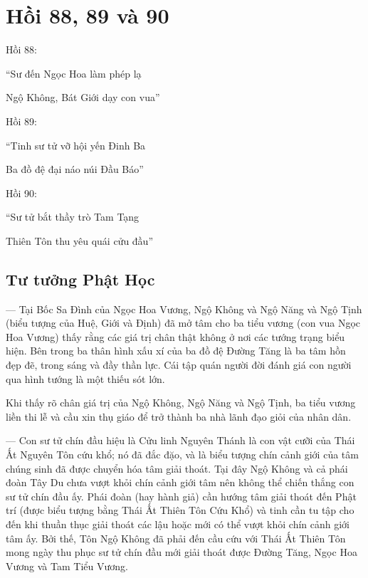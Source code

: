\chapter{Hồi 88, 89 và 90} %
\label{cha:hoi_88_89_90}

Hồi 88:

\begin{itshape}
``Sư đến Ngọc Hoa làm phép lạ

Ngộ Không, Bát Giới dạy con vua''
\end{itshape}

Hồi 89:

\begin{itshape}
``Tinh sư tử vỡ hội yến Đinh Ba

Ba đồ đệ đại náo núi Đầu Báo''
\end{itshape}

Hồi 90:

\begin{itshape}
``Sư tử bắt thầy trò Tam Tạng

Thiên Tôn thu yêu quái cửu đầu''
\end{itshape}

\section{Tư tưởng Phật Học} %
\label{sec:88_89_90_phat_hoc}

— Tại Bốc Sa Đình của Ngọc Hoa Vương, Ngộ Không và Ngộ Năng và Ngộ Tịnh (biểu tượng của Huệ, Giới và Định) đã mở tâm cho ba tiểu vương (con vua Ngọc Hoa Vương) thấy rằng các giá trị chân thật không ở nơi các tướng trạng biểu hiện. Bên trong ba thân hình xấu xí của ba đồ đệ Đường Tăng là ba tâm hồn đẹp đẽ, trong sáng và đầy thần lực. Cái tập quán người đời đánh giá con người qua hình tướng là một thiếu sót lớn.

Khi thấy rõ chân giá trị của Ngộ Không, Ngộ Năng và Ngộ Tịnh, ba tiểu vương liền thi lễ và cầu xin thụ giáo để trở thành ba nhà lãnh đạo giỏi của nhân dân.

— Con sư tử chín đầu hiệu là Cửu linh Nguyên Thánh là con vật cưỡi của Thái Ất Nguyên Tôn cứu khổ; nó đã đắc đặo, và là biểu tượng chín cảnh giới của tâm chúng sinh đã được chuyển hóa tâm giải thoát. Tại đây Ngộ Không và cả phái đoàn Tây Du chưa vượt khỏi chín cảnh giới tâm nên không thể chiến thắng con sư tử chín đầu ấy. Phái đoàn (hay hành giả) cần hướng tâm giải thoát đến Phật trí (được biểu tượng bằng Thái Ất Thiên Tôn Cứu Khổ) và tinh cần tu tập cho đến khi thuần thục giải thoát các lậu hoặc mới có thể vượt khỏi chín cảnh giới tâm ấy. Bởi thế, Tôn Ngộ Không đã phải đến cầu cứu với Thái Ất Thiên Tôn mong ngày thu phục sư tử chín đầu mới giải thoát được Đường Tăng, Ngọc Hoa Vương và Tam Tiểu Vương.

